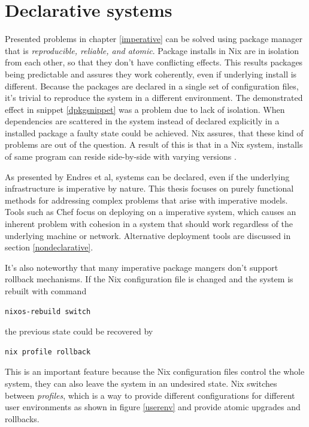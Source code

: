 \section{Declarative systems} \label{declarativesystems}

Presented problems in chapter \ref{imperative} can be solved using package manager that is \textit{reproducible, reliable, and atomic}. Package installs in Nix are in isolation from each other, so that they don't have conflicting effects. This results packages being predictable and assures they work coherently, even if underlying install is different. Because the packages are declared in a single set of configuration files, it's trivial to reproduce the system in a different environment. The demonstrated effect in snippet \ref{dpkgsnippet} was a problem due to lack of isolation. When dependencies are scattered in the system instead of declared explicitly in a installed package a faulty state could be achieved. Nix assures, that these kind of problems are out of the question. A result of this is that in a Nix system, installs of same program can reside side-by-side with varying versions \cite{dolstra2008nixos}.

As presented by Endres et al, systems can be declared, even if the underlying infrastructure is imperative by nature. \cite{endres2017declarative} This thesis focuses on purely functional methods for addressing complex problems that arise with imperative models. Tools such as Chef focus on deploying on a imperative system, which causes an inherent problem with cohesion in a system that should work regardless of the underlying machine or network. Alternative deployment tools are discussed in section \ref{nondeclarative}.

It's also noteworthy that many imperative package mangers don't support rollback mechanisms. If the Nix configuration file is changed and the system is rebuilt with command
\begin{lstlisting}
nixos-rebuild switch
\end{lstlisting}
the previous state could be recovered by \begin{lstlisting}
nix profile rollback
\end{lstlisting}
This is an important feature because the Nix configuration files control the whole system, they can also leave the system in an undesired state. Nix switches between \textit{profiles}, which is a way to provide different configurations for different user environments as shown in figure \ref{userenv} and provide atomic upgrades and rollbacks. \cite{nixosNixOSManual}

